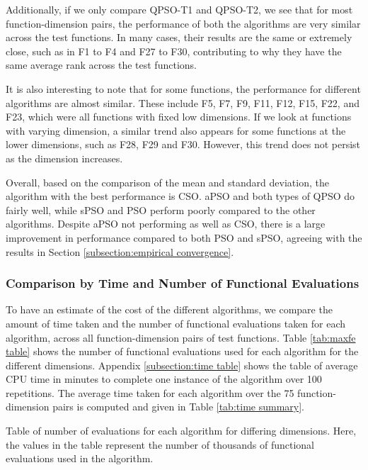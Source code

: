 \documentclass[12pt]{article}
\theoremstyle{definition}
\begin{document}
Additionally, if we only compare QPSO-T1 and QPSO-T2, we see that for most function-dimension pairs, the performance of both the algorithms are very similar across the test functions. In many cases, their results are the same or extremely close, such as in F1 to F4 and F27 to F30, contributing to why they have the same average rank across the test functions. \newline

It is also interesting to note that for some functions, the performance for different algorithms are almost similar. These include F5, F7, F9, F11, F12, F15, F22, and F23, which were all functions with fixed low dimensions. If we look at functions with varying dimension, a similar trend also appears for some functions at the lower dimensions, such as F28, F29 and F30. However, this trend does not persist as the dimension increases. \newline

Overall, based on the comparison of the mean and standard deviation, the algorithm with the best performance is CSO. aPSO and both types of QPSO do fairly well, while sPSO and PSO perform poorly compared to the other algorithms. Despite aPSO not performing as well as CSO, there is a large improvement in performance compared to both PSO and sPSO, agreeing with the results in Section \ref{subsection:empirical convergence}.

\subsubsection{Comparison by Time and Number of Functional Evaluations}
To have an estimate of the cost of the different algorithms, we compare the amount of time taken and the number of functional evaluations taken for each algorithm, across all function-dimension pairs of test functions. Table \ref{tab:maxfe table} shows the number of functional evaluations used for each algorithm for the different dimensions. Appendix \ref{subsection:time table} shows the table of average CPU time in minutes to complete one instance of the algorithm over 100 repetitions. The average time taken for each algorithm over the 75 function-dimension pairs is computed and given in Table \ref{tab:time summary}. \newline

\begin{table}[H]
    \centering
    \renewcommand{\arraystretch}{0.7}
    
    \renewcommand{\arraystretch}{1}
    \caption{Table of number of evaluations for each algorithm for differing dimensions. Here, the values in the table represent the number of thousands of functional evaluations used in the algorithm.}
    \label{tab:maxfe table}
\end{table}
\end{document}
